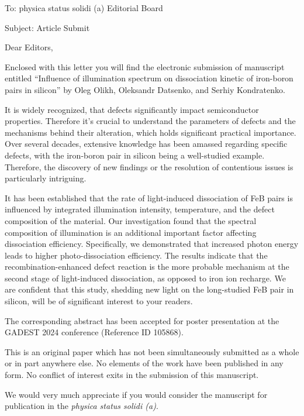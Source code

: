\documentclass[preprint]{elsarticle}
\begin{document}
To:
physica status solidi (a) Editorial Board


Subject:
Article Submit

\vspace{5mm}
Dear Editors,

\vspace{3mm}
Enclosed with this letter you will find the electronic submission of manuscript entitled
``Influence of illumination spectrum on dissociation kinetic of iron-boron pairs in silicon'' 
by Oleg Olikh, Oleksandr Datsenko, and Serhiy Kondratenko.


It is widely recognized, that defects significantly impact semiconductor properties.
Therefore it's crucial to understand the parameters of defects and the mechanisms behind their alteration, 
which holds significant practical importance. 
Over several decades, extensive knowledge has been amassed regarding specific defects, 
with the iron-boron pair in silicon being a well-studied example. 
Therefore, the discovery of new findings or the resolution of contentious issues is particularly intriguing.

It has been established that the rate of light-induced dissociation of FeB pairs is influenced by integrated illumination intensity, 
temperature, and the defect composition of the material. 
Our investigation found that the spectral composition of illumination is an additional important factor 
affecting dissociation efficiency. 
Specifically, we demonstrated that increased photon energy leads to higher photo-dissociation efficiency. 
The results indicate that the recombination-enhanced defect reaction is the more probable mechanism 
at the second stage of light-induced dissociation, as opposed to iron ion recharge.
We are confident that this study, shedding new light on the long-studied FeB pair in silicon, will be of significant interest to your readers.



The corresponding abstract has been accepted for poster presentation at the GADEST 2024 conference (Reference ID 105868).

This is an original paper which has not been simultaneously submitted as a whole or in part anywhere else.
No elements of the work have been published in any form.
No conflict of interest exits in the submission of this manuscript.


We would  very much appreciate if you would consider the manuscript for publication in the \emph{physica status solidi (a)}.
\end{document}
